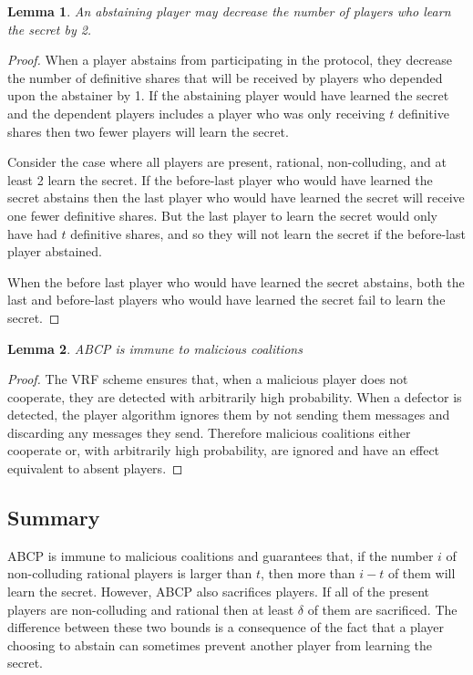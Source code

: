 \documentclass{dalcsthesis}
\newtheorem{lemma}{Lemma}
\begin{document}
\begin{lemma}An abstaining player may decrease the number of players who learn the secret by 2. \label{Lem:ABCP:AbstainBad} \end{lemma}
\begin{proof}
When a player abstains from participating in the protocol, they decrease the number of definitive shares that will be received by players who depended upon the abstainer by 1. If the abstaining player would have learned the secret and the dependent players includes a player who was only receiving $t$ definitive shares then two fewer players will learn the secret.

Consider the case where all players are present, rational, non-colluding, and at least 2 learn the secret. If the before-last player who would have learned the secret abstains then the last player who would have learned the secret will receive one fewer definitive shares. But the last player to learn the secret would only have had $t$ definitive shares, and so they will not learn the secret if the before-last player abstained.

When the before last player who would have learned the secret abstains, both the last and before-last players who would have learned the secret fail to learn the secret.
\end{proof}

\begin{lemma} ABCP is immune to malicious coalitions \label{Lem:ABCP:MalImmune} \end{lemma}
\begin{proof}
The VRF scheme ensures that, when a malicious player does not cooperate, they are detected with arbitrarily high probability. When a defector is detected, the player algorithm ignores them by not sending them messages and discarding any messages they send. Therefore malicious coalitions either cooperate or, with arbitrarily high probability, are ignored and have an effect equivalent to absent players.
\end{proof}

\subsection{Summary}

ABCP is immune to malicious coalitions and guarantees that, if the number $i$ of non-colluding rational players is larger than $t$, then more than $i-t$ of them will learn the secret. However, ABCP also sacrifices players. If all of the present players are non-colluding and rational then at least $\delta$ of them are sacrificed. The difference between these two bounds is a consequence of the fact that a player choosing to abstain can sometimes prevent another player from learning the secret.
\end{document}
